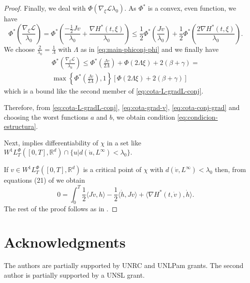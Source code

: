 \documentclass[twoside]{article}
\theoremstyle{remark}
\newcommand{\lphi}{L^{\Phi}}
\newcommand{\wphit}{W^{1}\lphi_T}
\newcommand{\rr}{\mathbb{R}}
\renewcommand{\leq}{\leqslant}
\begin{document}
\begin{proof}
Finally, we deal with $\Phi(\nabla_{\xi}\mathcal{L}{\lambda_0})$. 
As $\Phi^*$ is a convex, even function, we have
\[\Phi^*\left(\frac{\nabla_{\xi}\mathcal{L}}{\lambda_0}\right)=
\Phi^*\left(\frac{-\frac{1}{2}Jv}{\lambda_0}+\frac{\nabla H^*(t,\xi)}{\lambda_0}\right)
\leq
\frac{1}{2} \Phi^*\left(\frac{Jv}{\lambda_0}\right)+
\frac{1}{2}\Phi^*\left(\frac{2 \nabla H^*(t,\xi)}{\lambda_0}\right).
\]
We choose $\frac{2}{\lambda_0}=\frac{1}{\Lambda}$ with $\Lambda$ as in \eqref{eq:main-phiconj-phi} and 
we finally have
\begin{equation}\label{eq:cota-conj-grad}
\begin{split}
\Phi^*\left(\frac{\nabla_{\xi}\mathcal{L}}{\lambda_0}\right)\leq 
\Phi^*\left(\frac{Jv}{2\Lambda}\right)+\Phi(2\Lambda\xi)+2(\beta+\gamma)=\\
\max\left\{\Phi^*\left(\frac{Jv}{2\Lambda}\right),1\right\}
\left[\Phi(2\Lambda\xi)+2(\beta+\gamma)\right]
\end{split}
\end{equation}
which is a bound like the second member of \eqref{eq:cota-L-gradL-conj}.

Therefore, from \eqref{eq:cota-L-gradL-conj}, \eqref{eq:cota-grad-v}, \eqref{eq:cota-conj-grad} and choosing the worst functions $a$ and $b$, 
we obtain condition \eqref{eq:condicion-estructura}.

Next, \cite[Thm. 4.5]{MA2017} implies differentiability of $\chi$ in a set like 
$\wphit([0,T],\rr^d)\cap\{u|d(\dot{u},L^{\infty})<\lambda_0\}$.

If $v \in \wphit([0,T],\rr^d)$ is a critical point of $\chi$ with $d(\dot{v},L^{\infty})<\lambda_0$
then, from equations (21) of \cite{MA2017} we obtain
\[
0=\int_0^T \frac{1}{2} \langle J\dot{v},h\rangle-\frac{1}{2} \langle \dot{h},Jv \rangle
+\langle \nabla H^*(t,\dot{v}),\dot{h} \rangle.
\]
The rest of the proof follows as in \cite{mawhin2010critical}.

\end{proof}


\section*{Acknowledgments}
The authors are partially supported by  UNRC and UNLPam grants. The second author is  partially supported by a  UNSL grant. 




% 
 
 

\end{document}
